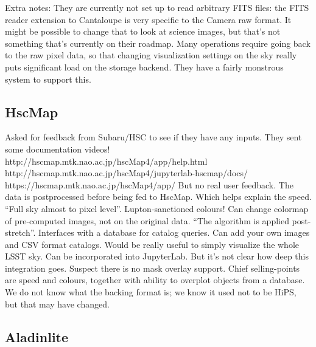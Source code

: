 Extra notes:
They are currently not set up to read arbitrary FITS files: the FITS reader extension to Cantaloupe is very specific to the Camera raw format. It might be possible to change that to look at science images, but that's not something that's currently on their roadmap.
Many operations require going back to the raw pixel data, so that changing visualization settings on the sky really puts significant load on the storage backend. They have a fairly monstrous system to support this.

\subsection{HscMap}

Asked for feedback from Subaru/HSC to see if they have any inputs.
They sent some documentation videos!
http://hscmap.mtk.nao.ac.jp/hscMap4/app/help.html
http://hscmap.mtk.nao.ac.jp/hscMap4/jupyterlab-hscmap/docs/
https://hscmap.mtk.nao.ac.jp/hscMap4/app/
But no real user feedback.
The data is postprocessed before being fed to HscMap.
Which helps explain the speed.
``Full sky almost to pixel level''.
Lupton-sanctioned colours!
Can change colormap of pre-computed images, not on the original data.
``The algorithm is applied post-stretch''.
Interfaces with a database for catalog queries.
Can add your own images and CSV format catalogs.
Would be really useful to simply visualize the whole LSST sky.
Can be incorporated into JupyterLab.
But it's not clear how deep this integration goes.
Suspect there is no mask overlay support.
Chief selling-points are speed and colours, together with ability to overplot objects from a database.
We do not know what the backing format is; we know it used not to be HiPS, but that may have changed.

\subsection{Aladinlite}

